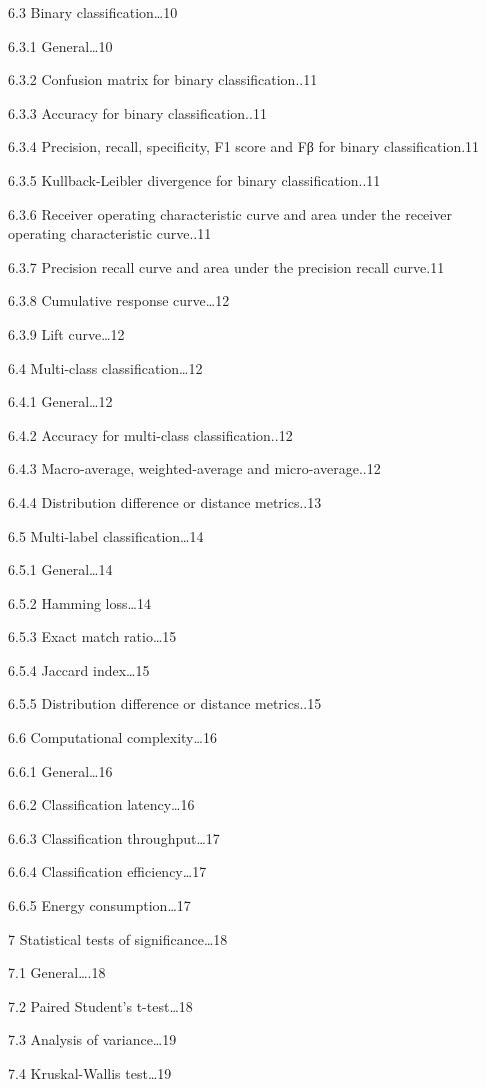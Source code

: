 \documentclass[
  letterpaper,
  DIV=11,
  numbers=noendperiod,
  oneside]{scrreprt}
\begin{document}
\begin{tcolorbox}
6.3 Binary classification\ldots10

6.3.1 General\ldots10

6.3.2 Confusion matrix for binary classification..11

6.3.3 Accuracy for binary classification..11

6.3.4 Precision, recall, specificity, F1 score and Fβ for binary
classification.11

6.3.5 Kullback-Leibler divergence for binary classification..11

6.3.6 Receiver operating characteristic curve and area under the
receiver operating characteristic curve..11

6.3.7 Precision recall curve and area under the precision recall
curve.11

6.3.8 Cumulative response curve\ldots12

6.3.9 Lift curve\ldots12

6.4 Multi-class classification\ldots12

6.4.1 General\ldots12

6.4.2 Accuracy for multi-class classification..12

6.4.3 Macro-average, weighted-average and micro-average..12

6.4.4 Distribution difference or distance metrics..13

6.5 Multi-label classification\ldots14

6.5.1 General\ldots14

6.5.2 Hamming loss\ldots14

6.5.3 Exact match ratio\ldots15

6.5.4 Jaccard index\ldots15

6.5.5 Distribution difference or distance metrics..15

6.6 Computational complexity\ldots16

6.6.1 General\ldots16

6.6.2 Classification latency\ldots16

6.6.3 Classification throughput\ldots17

6.6.4 Classification efficiency\ldots17

6.6.5 Energy consumption\ldots17

7 Statistical tests of significance\ldots18

7.1 General\ldots.18

7.2 Paired Student's t-test\ldots18

7.3 Analysis of variance\ldots19

7.4 Kruskal-Wallis test\ldots19


\end{tcolorbox}
\end{document}

